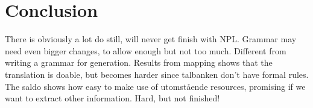 \documentclass{article}
\begin{document}
\section{Conclusion}
There is obviously a lot do still, will never get finish with NPL.
Grammar may need even bigger changes, to allow enough but not too much.
Different from writing a grammar for generation.
Results from mapping shows that the translation is doable, but becomes harder
since talbanken don't have formal rules.
The saldo shows how easy to make use of utomstående resources, promising if
we want to extract other information. 
Hard, but not finished! 
\end{document}
